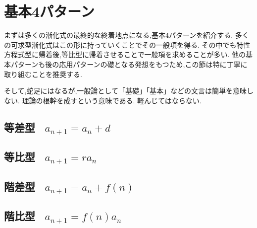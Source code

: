 
\section{基本4パターン}
まずは多くの漸化式の最終的な終着地点になる,基本4パターンを紹介する.
多くの可求型漸化式はこの形に持っていくことでその一般項を得る.
その中でも特性方程式型に帰着後,等比型に帰着させることで一般項を求めることが多い.
他の基本パターンも後の応用パターンの礎となる発想をもつため,この節は特に丁寧に取り組むことを推奨する.

そして,蛇足にはなるが,一般論として「基礎」「基本」などの文言は簡単を意味しない.
理論の根幹を成すという意味である.
軽んじてはならない.

\subsection{等差型 \, $a_{n+1}=a_n+d$}


\subsection{等比型 \, $a_{n+1}=ra_n$}


\subsection{階差型 \, $a_{n+1}=a_n+f(n)$}


\subsection{階比型 \, $a_{n+1}=f(n)a_n$}

